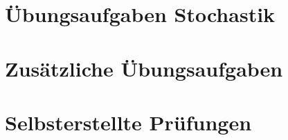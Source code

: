 \documentclass[11pt, oneside]{report}
\begin{document}
	\part{Übungsaufgaben Stochastik}
	
	
	
	
	
	
	

	\part{Zusätzliche Übungsaufgaben}
	

	\part{Selbsterstellte Prüfungen}
	
	
	
	
\end{document}
